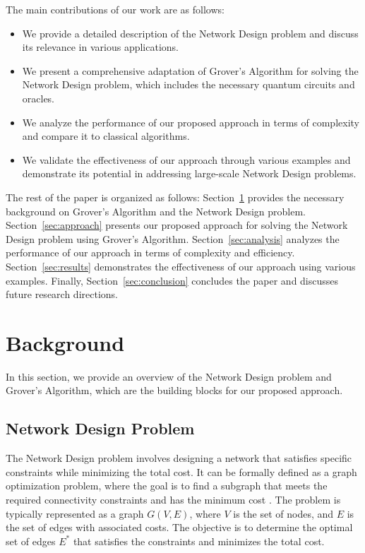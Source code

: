 The main contributions of our work are as follows:

\begin{itemize}
    \item We provide a detailed description of the Network Design problem and discuss its relevance in various applications.
    
    \item We present a comprehensive adaptation of Grover's Algorithm for solving the Network Design problem, which includes the necessary quantum circuits and oracles.
    
    \item We analyze the performance of our proposed approach in terms of complexity and compare it to classical algorithms.
    
    \item We validate the effectiveness of our approach through various examples and demonstrate its potential in addressing large-scale Network Design problems.
\end{itemize}

The rest of the paper is organized as follows: Section~\ref{sec:background} provides the necessary background on Grover's Algorithm and the Network Design problem. Section~\ref{sec:approach} presents our proposed approach for solving the Network Design problem using Grover's Algorithm. Section~\ref{sec:analysis} analyzes the performance of our approach in terms of complexity and efficiency. Section~\ref{sec:results} demonstrates the effectiveness of our approach using various examples. Finally, Section~\ref{sec:conclusion} concludes the paper and discusses future research directions.

\section{Background} \label{sec:background}

In this section, we provide an overview of the Network Design problem and Grover's Algorithm, which are the building blocks for our proposed approach.

\subsection{Network Design Problem}

The Network Design problem involves designing a network that satisfies specific constraints while minimizing the total cost. It can be formally defined as a graph optimization problem, where the goal is to find a subgraph that meets the required connectivity constraints and has the minimum cost \cite{magnanti1995network}. The problem is typically represented as a graph $G(V, E)$, where $V$ is the set of nodes, and $E$ is the set of edges with associated costs. The objective is to determine the optimal set of edges $E^*$ that satisfies the constraints and minimizes the total cost.

